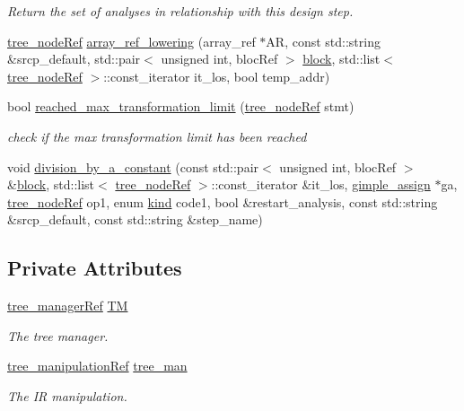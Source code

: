 \begin{DoxyCompactItemize}
\begin{DoxyCompactList}\small\item\em Return the set of analyses in relationship with this design step. \end{DoxyCompactList}\item 
\hyperlink{tree__node_8hpp_a6ee377554d1c4871ad66a337eaa67fd5}{tree\+\_\+node\+Ref} \hyperlink{classIR__lowering_adaba1afb2ed746864d7e0bc9d2b1c25d}{array\+\_\+ref\+\_\+lowering} (array\+\_\+ref $\ast$AR, const std\+::string \&srcp\+\_\+default, std\+::pair$<$ unsigned int, bloc\+Ref $>$ \hyperlink{structblock}{block}, std\+::list$<$ \hyperlink{tree__node_8hpp_a6ee377554d1c4871ad66a337eaa67fd5}{tree\+\_\+node\+Ref} $>$\+::const\+\_\+iterator it\+\_\+los, bool temp\+\_\+addr)
\item 
bool \hyperlink{classIR__lowering_a1c9f8a152838d5330a866220393119ff}{reached\+\_\+max\+\_\+transformation\+\_\+limit} (\hyperlink{tree__node_8hpp_a6ee377554d1c4871ad66a337eaa67fd5}{tree\+\_\+node\+Ref} stmt)
\begin{DoxyCompactList}\small\item\em check if the max transformation limit has been reached \end{DoxyCompactList}\item 
void \hyperlink{classIR__lowering_ad68af9b9031624406acd7557e3e30c9f}{division\+\_\+by\+\_\+a\+\_\+constant} (const std\+::pair$<$ unsigned int, bloc\+Ref $>$ \&\hyperlink{structblock}{block}, std\+::list$<$ \hyperlink{tree__node_8hpp_a6ee377554d1c4871ad66a337eaa67fd5}{tree\+\_\+node\+Ref} $>$\+::const\+\_\+iterator \&it\+\_\+los, \hyperlink{structgimple__assign}{gimple\+\_\+assign} $\ast$ga, \hyperlink{tree__node_8hpp_a6ee377554d1c4871ad66a337eaa67fd5}{tree\+\_\+node\+Ref} op1, enum \hyperlink{tree__common_8hpp_a9efbd7c7191fb190b76c2fd05d6e7b45}{kind} code1, bool \&restart\+\_\+analysis, const std\+::string \&srcp\+\_\+default, const std\+::string \&step\+\_\+name)
\end{DoxyCompactItemize}
\subsection*{Private Attributes}
\begin{DoxyCompactItemize}
\item 
\hyperlink{tree__manager_8hpp_a96ff150c071ce11a9a7a1e40590f205e}{tree\+\_\+manager\+Ref} \hyperlink{classIR__lowering_a09f29d65e37fa212874e351f82c1fb54}{TM}
\begin{DoxyCompactList}\small\item\em The tree manager. \end{DoxyCompactList}\item 
\hyperlink{tree__manipulation_8hpp_a1a9460e3a2f9fc6a96cfd2f24cc9b2a5}{tree\+\_\+manipulation\+Ref} \hyperlink{classIR__lowering_add46902d334d46da094f417dd5cd4ba8}{tree\+\_\+man}
\begin{DoxyCompactList}\small\item\em The IR manipulation. \end{DoxyCompactList}\end{DoxyCompactItemize}
